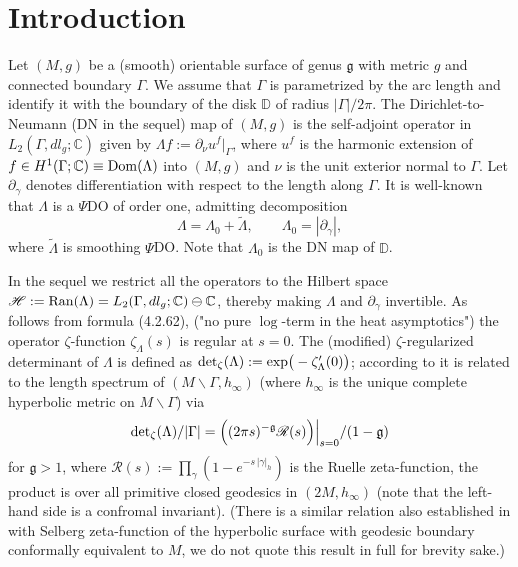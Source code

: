 \documentclass{amsart}
\begin{document}
\section*{Introduction}
Let $(M,g)$ be a (smooth) orientable surface of genus $\mathfrak{g}$ with metric $g$ and connected boundary $\Gamma$. We assume that $\Gamma$ is parametrized by the arc length and identify it with the boundary of the disk $\mathbb{D}$ of radius $|\Gamma|/2\pi$. The Dirichlet-to-Neumann (DN  in the sequel) map of $(M,g)$ is the self-adjoint operator in $L_2(\Gamma,dl_g;\mathbb{C})$ given by $\Lambda f:=\partial_\nu u^f|_\Gamma$, where $u^f$ is the harmonic extension of $f\in H^{1}(\Gamma;\mathbb{C})\equiv {\rm Dom}(\Lambda)$ into $(M,g)$ and $\nu$ is the unit exterior normal to $\Gamma$. Let $\partial_\gamma$ denotes differentiation with respect to the length along $\Gamma$. It is well-known \cite{LeeU} that $\Lambda$ is a $\Psi$DO of order one, admitting decomposition
\begin{equation}
\label{DN PDO decomp}
\Lambda=\Lambda_0+\tilde{\Lambda}, \qquad \Lambda_0=|\partial_\gamma|,
\end{equation}
where $\tilde{\Lambda}$ is smoothing $\Psi$DO. Note that $\Lambda_0$ is the DN map of $\mathbb{D}$.

In the sequel we restrict all the operators to the Hilbert space $\mathscr{H}:={\rm Ran}(\Lambda)=L_2(\Gamma,dl_g;\mathbb{C})\ominus\mathbb{C}$, thereby making $\Lambda$ and $\partial_\gamma$ invertible. As follows from formula (4.2.62), \cite{Grubb} ("no pure $\log$-term in the heat asymptotics")  the operator $\zeta$-function $\zeta_{\Lambda}(s)$ is regular at $s=0$. The (modified) $\zeta$-regularized determinant of $\Lambda$ is defined as ${\rm det}_\zeta(\Lambda):={\rm exp}\big(-\zeta'_\Lambda(0)\big)$; according to  \cite{Guillarmou} it is related to the length spectrum of $(M\backslash\Gamma,h_\infty)$ (where $h_\infty$ is the unique complete hyperbolic metric on $M\backslash\Gamma$) via
\begin{equation}
\label{GG formula}
{\rm det}_\zeta(\Lambda)/|\Gamma|=\Big((2\pi s)^{-\mathfrak{g}}\mathscr{R}(s)\Big)\Big|_{s=0}/(1-\mathfrak{g})
\end{equation}
for $\mathfrak{g}>1$, where $\mathscr{R}(s):=\prod_{\gamma}(1-e^{-s\,|\gamma|_h})$ is the Ruelle zeta-function, the product is over all primitive closed geodesics in $(2M,h_\infty)$ (note that the left-hand side is a confromal invariant). (There is a similar relation also established in  \cite{Guillarmou} with Selberg zeta-function  of the hyperbolic surface with geodesic boundary conformally equivalent to $M$, we do not quote this result in full for brevity sake.)
\end{document}
